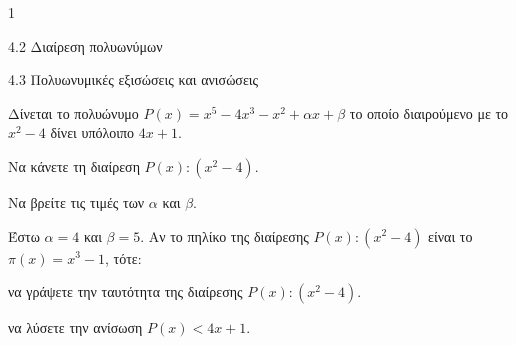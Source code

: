 \begin{ylh}{1}
\item 4.2 Διαίρεση πολυωνύμων
\item 4.3 Πολυωνυμικές εξισώσεις και ανισώσεις
\end{ylh}
Δίνεται το πολυώνυμο $P(x) = x^5 - 4x^3 - x^2 + \alpha x + \beta$ το οποίο διαιρούμενο με το $x^2 - 4$ δίνει υπόλοιπο $4x + 1$.
\begin{alist}
\item Να κάνετε τη διαίρεση $P(x) : (x^2 - 4)$.
\item Να βρείτε τις τιμές των $\alpha$ και $\beta$.
\item Έστω $\alpha = 4$ και $\beta = 5$. Αν το πηλίκο της διαίρεσης $P(x) : (x^2 - 4)$ είναι το $\pi(x) = x^3 - 1$, τότε:
\begin{rlist}
\item να γράψετε την ταυτότητα της διαίρεσης $P(x) : (x^2 - 4)$.
\item να λύσετε την ανίσωση $P(x) < 4x + 1$.
\end{rlist}
\end{alist}

